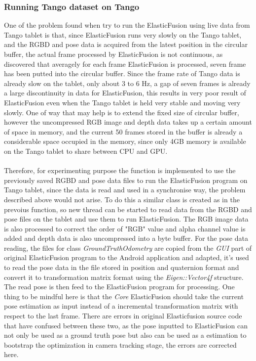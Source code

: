 \documentclass[12pt,twoside]{article}
\begin{document}
\subsubsection{Running Tango dataset on Tango}
One of the problem found when try to run the ElasticFusion using live data from Tango tablet is that, since ElasticFusion runs very slowly on the Tango tablet, and the RGBD and pose data is acquired from the latest position in the circular buffer, the actual frame processed by ElasticFusion is not continuous, as discovered that averagely for each frame ElasticFusion is processed, seven frame has been putted into the circular buffer. Since the frame rate of Tango data is already slow on the tablet, only about 3 to 6 Hz, a gap of seven frames is already a large discontinuity in data for ElasticFusion, this results in very poor result of ElasticFusion even when the Tango tablet is held very stable and moving very slowly. One of way that may help is to extend the fixed size of circular buffer, however the uncompressed RGB image and depth data takes up a certain amount of space in memory, and the current 50 frames stored in the buffer is already a considerable space occupied in the memory, since only 4GB memory is available on the Tango tablet to share between CPU and GPU.\\
\\
Therefore, for experimenting purpose the function is implemented to use the previously saved RGBD and pose data files to run the ElasticFusion program on Tango tablet, since the data is read and used in a synchronise way, the problem described above would not arise. To do this a similar class is created as in the prevoius function, so new thread can be started to read data from the RGBD and pose files on the tablet and use them to run ElasticFusion. The RGB image data is also processed to correct the order of "RGB" value and alpha channel value is added and depth data is also uncompressed into a byte buffer. For the pose data reading, the files for class \textit{GroundTruthOdometry} are copied from the \textit{GUI} part of original ElasticFusion program to the Android application and adapted, it's used to read the pose data in the file stored in position and quaternion format and convert it to transformation matrix format using the \textit{Eigen::Vector4f} structure. The read pose is then feed to the ElasticFusion program for processing. One thing to be mindful here is that the \textit{Core} ElasticFusion should take the current pose estimation as input instead of a incremental transformation matrix with respect to the last frame. There are errors in original Elasticfusion source code that have confused between these two, as the pose inputted to ElasticFusion can not only be used as a ground truth pose but also can be used as a estimation to bootstrap the optimization in camera tracking stage, the errors are corrected here.\\
\end{document}
